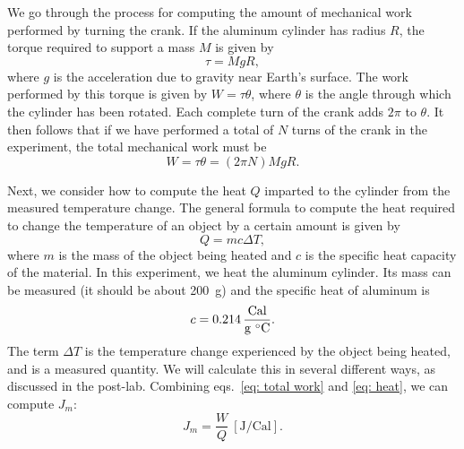 \documentclass[addpoints]{physlabs}
\begin{document}
\begin{labsection}
\begin{theory}
    We go through the process for computing the amount of mechanical work performed by turning the crank. If the aluminum cylinder has radius $R$, the torque required to support a mass $M$ is given by
    \begin{equation}\label{eq: torque}
        \tau = MgR,
    \end{equation}
    where $g$ is the acceleration due to gravity near Earth's surface. The work performed by this torque is given by $W=\tau\theta$, where $\theta$ is the angle through which the cylinder has been rotated. Each complete turn of the crank adds $2\pi$ to $\theta$. It then follows that if we have performed a total of $N$ turns of the crank in the experiment, the total mechanical work must be
    \begin{equation}\label{eq: total work}
        W = \tau\theta = (2\pi N) MgR.
    \end{equation}

    Next, we consider how to compute the heat $Q$ imparted to the cylinder from the measured temperature change. The general formula to compute the heat required to change the temperature of an object by a certain amount is given by
    \begin{equation}\label{eq: heat}
        Q = mc\Delta T,
    \end{equation}
    where $m$ is the mass of the object being heated and $c$ is the specific heat capacity of the material. In this experiment, we heat the aluminum cylinder. Its mass can be measured (it should be about \qty{200}{\gram}) and the specific heat of aluminum is
    \begin{equation}\label{eq: specific heat capacity}
        c = \qty{0.214}{\frac{Cal}{\gram\ \celsius}}.
    \end{equation}
    The term $\Delta T$ is the temperature change experienced by the object being heated, and is a measured quantity. We will calculate this in several different ways, as discussed in the post-lab. Combining eqs.~\ref{eq: total work} and \ref{eq: heat}, we can compute $J_m$:
    \begin{equation}\label{eq: joule's constant measured}
        J_m = \frac{W}{Q} %
        \ [\text{J/Cal}].
    \end{equation}
\end{theory}

\begin{experiment}


\end{experiment}
\end{labsection}
\end{document}
